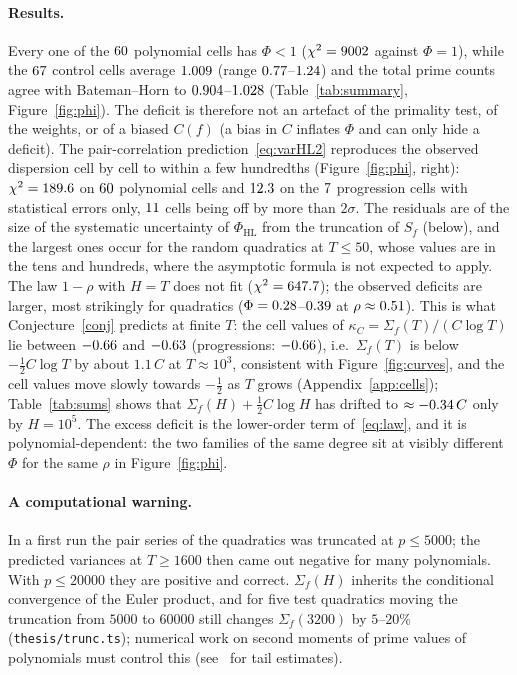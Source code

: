 \documentclass[11pt,a4paper]{article}
\theoremstyle{remark}\newtheorem{remark}[theorem]{Remark}
\begin{document}
\paragraph{Results.} Every one of the $60$ polynomial cells has $\Phi<1$
($\chi^2=9002$ against $\Phi=1$), while the $67$ control cells average $1.009$ (range
$0.77$--$1.24$) and the total prime counts agree with Bateman--Horn to
$0.904$--$1.028$ (Table~\ref{tab:summary}, Figure~\ref{fig:phi}). The deficit is therefore
not an artefact of the primality test, of the weights, or of a biased $C(f)$ (a bias in $C$ inflates
$\Phi$ and can only hide a deficit). The pair-correlation prediction~\eqref{eq:varHL2} reproduces the
observed dispersion cell by cell to within a few hundredths (Figure~\ref{fig:phi}, right):
$\chi^2=189.6$ on $60$ polynomial cells and $12.3$ on the $7$ progression cells with
statistical errors only, $11$ cells being off by more than $2\sigma$. The residuals are of the size
of the systematic uncertainty of $\Phi_{\mathrm{HL}}$ from the truncation of $S_f$ (below), and the
largest ones occur for the random quadratics at $T\le50$, whose values are in the tens and hundreds,
where the asymptotic formula is not expected to apply. The law $1-\rho$ with
$H=T$ does not fit ($\chi^2=647.7$); the observed deficits are larger, most strikingly for quadratics
($\Phi=0.28$--$0.39$ at $\rho\approx0.51$). This is what Conjecture~\ref{conj} predicts
at finite $T$: the cell values of $\kappa_C=\Sigma_f(T)/(C\log T)$ lie between $-0.66$ and
$-0.63$ (progressions: $-0.66$), i.e.\ $\Sigma_f(T)$ is below $-\tfrac12C\log T$ by
about $1.1\,C$ at $T\approx10^3$, consistent with Figure~\ref{fig:curves}, and the cell values move
slowly towards $-\tfrac12$ as $T$ grows (Appendix~\ref{app:cells}); Table~\ref{tab:sums} shows that
$\Sigma_f(H)+\tfrac12C\log H$ has drifted to $\approx-0.34\,C$ only by $H=10^5$. The excess
deficit is the lower-order term of~\eqref{eq:law}, and it is polynomial-dependent: the two families of
the same degree sit at visibly different $\Phi$ for the same $\rho$ in Figure~\ref{fig:phi}.

\paragraph{A computational warning.} In a first run the pair series of the quadratics was truncated at
$p\le5000$; the predicted variances at $T\ge1600$ then came out negative for many polynomials. With
$p\le20000$ they are positive and correct. $\Sigma_f(H)$ inherits the conditional convergence of the
Euler product, and for five test quadratics moving the truncation from $5000$ to $60000$ still changes
$\Sigma_f(3200)$ by $5$--$20\%$ (\texttt{thesis/trunc.ts}); numerical work on second moments of prime
values of polynomials must control this (see~\cite{Volfson2026} for tail estimates).
\end{document}

